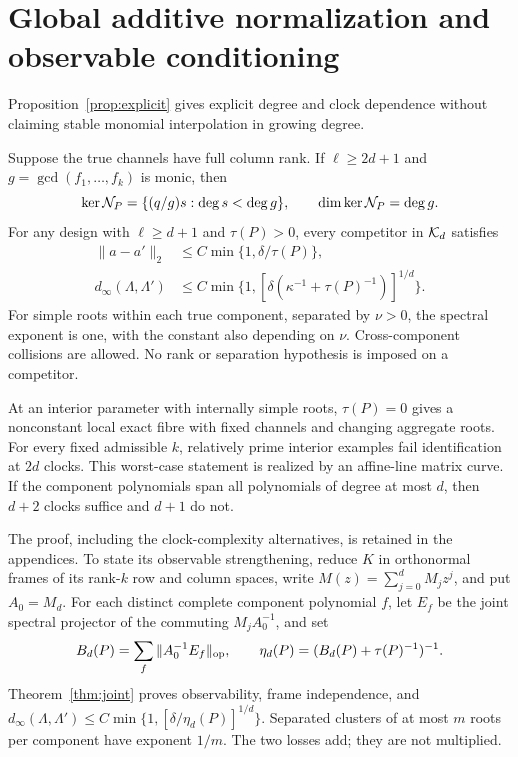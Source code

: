 \section{Global additive normalization and observable conditioning}
Proposition~\ref{prop:explicit} gives explicit degree and clock dependence
without claiming stable monomial interpolation in growing degree.
\begin{theorem}
\label{thm:main}
Suppose the true channels have full column rank. If $\ell\ge2d+1$
and $g=\gcd(f_1,\ldots,f_k)$ is monic, then
\begin{equation}\label{eq:kernel}
 \ker\mathcal N_P=\{(q/g)s:\deg s<\deg g\},\qquad
 \dim\ker\mathcal N_P=\deg g.
\end{equation}
For any design with $\ell\ge d+1$ and $\tau(P)>0$, every competitor
in $\mathcal K_d$ satisfies
\begin{align}
 \|a-a'\|_2&\le C\min\{1,\delta/\tau(P)\},\label{eq:q-bound}\\
 d_\infty(\Lambda,\Lambda')&\le
 C\min\{1,[\delta(\kappa^{-1}+\tau(P)^{-1})]^{1/d}\}.
 \label{eq:poly-bound}
\end{align}
For simple roots within each true component, separated by $\nu>0$,
the spectral exponent is one, with the constant also depending on
$\nu$. Cross-component collisions are allowed. No rank or separation
hypothesis is imposed on a competitor.

At an interior parameter with internally simple roots, $\tau(P)=0$
gives a nonconstant local exact fibre with fixed channels and changing
aggregate roots. For every fixed admissible $k$, relatively prime
interior examples fail identification at $2d$ clocks. This worst-case
statement is realized by an affine-line matrix curve. If the component
polynomials span all polynomials of degree at most $d$, then $d+2$
clocks suffice and $d+1$ do not.
\end{theorem}
The proof, including the clock-complexity alternatives, is retained
in the appendices. To state its observable strengthening, reduce
$K$ in orthonormal frames of its rank-$k$ row and column spaces,
write $M(z)=\sum_{j=0}^dM_jz^j$, and put $A_0=M_d$.
For each distinct complete component polynomial $f$, let $E_f$ be
the joint spectral projector of the commuting $M_jA_0^{-1}$, and set
\[
 B_d(P)=\sum_f\|A_0^{-1}E_f\|_{\mathrm{op}},
 \qquad \eta_d(P)=(B_d(P)+\tau(P)^{-1})^{-1}.
\]
Theorem~\ref{thm:joint} proves observability, frame independence, and
$d_\infty(\Lambda,\Lambda')\le
C\min\{1,[\delta/\eta_d(P)]^{1/d}\}$.
Separated clusters of at most $m$ roots per component have exponent
$1/m$. The two losses add; they are not multiplied.

